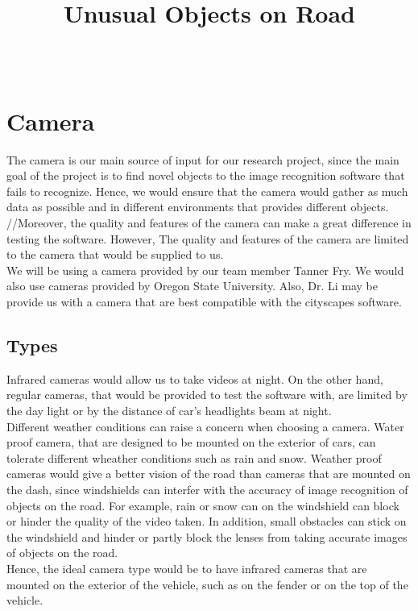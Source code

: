 \documentclass[10pt,draftclsnofoot,onecolumn,journal,compsoc]{IEEEtran}
\title{Unusual Objects on Road}
\author{
  \IEEEauthorblockN{Team (Group 32) name: Teaching AutoPilot to Dodge\\ Basil Al Zamil} \\
  \IEEEauthorblockA{CS 461: Senior Capstone Fall 2016 \\ Oregon State University}
}
\date{}
\begin{document}
\maketitle
\IEEEdisplaynontitleabstractindextext
\IEEEpeerreviewmaketitle

\newpage

\tableofcontents

\newpage


\section{Camera}

The camera is our main source of input for our research project, since the main goal of the project is to find novel objects to the image recognition software that fails to recognize. Hence, we would ensure that the camera would gather as much data as possible and in different environments that provides different objects. //Moreover, the quality and features of the camera can make a great difference in testing the software. However, The quality and features of the camera are limited to the camera that would be supplied to us. 
\\
We will be using a camera provided by our team member Tanner Fry. We would also use cameras provided by Oregon State University. Also, Dr. Li may be provide us with a camera that are best compatible with the cityscapes software.

\subsection{Types} Infrared cameras would allow us to take videos at night. On the other hand, regular cameras, that would be provided to test the software with, are limited by the day light or by the distance of car's headlights beam at night. 
\\
Different weather conditions can raise a concern when choosing a camera. Water proof camera, that are designed to be mounted on the exterior of cars, can tolerate different wheather conditions such as rain and snow. Weather proof cameras would give a better vision of the road than cameras that are mounted on the dash, since windshields can interfer with the accuracy of image recognition of objects on the road. For example, rain or snow can on the windshield can block or hinder the quality of the video taken. In addition, small obstacles can stick on the windshield and hinder or partly block the lenses from taking accurate images of objects on the road.
\\
Hence, the ideal camera type would be to have infrared cameras that are mounted on the exterior of the vehicle, such as on the fender or on the top of the vehicle.
\end{document}
